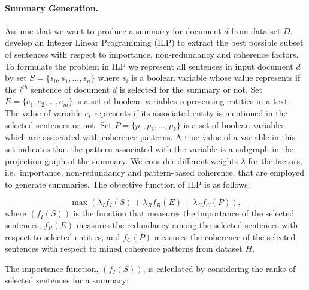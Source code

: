 \paragraph{Summary Generation.}
Assume that we want to produce a summary for document $d$ from data set $D$. 
 develop an Integer Linear Programming (ILP) to extract the best possible subset of sentences with respect to importance, non-redundancy and coherence factors. 
To formulate the problem in ILP we represent all sentences in input document $d$ by set $S = \lbrace s_0,s_1,...,s_n \rbrace$ where $s_i$ is a boolean variable whose value represents if the $i^{th}$ sentence of document $d$ is selected for the summary or not.  
Set $E=\lbrace e_1, e_2,...,e_m \rbrace$ is a set of boolean variables representing entities in a text. 
The value of variable $e_i$ represents if its associated entity is mentioned in the selected sentences or not. 
Set $P= \lbrace p_1,p_2,..., p_k \rbrace$ is a set of boolean variables which are associated with coherence patterns. 
A true value of a variable in this set indicates that the pattern associated with the variable is a subgraph in the projection graph of the summary. 
We consider different weights $\lambda$ for the factors, i.e.\ importance, non-redundancy and pattern-based coherence, that are employed to generate summaries. 
The objective function of ILP is as follows:

\begin{equation}
\max(\lambda_I f_I(S) + \lambda_R f_R(E) + \lambda_C f_C(P )),
\end{equation}
where $(f_I(S))$ is the function that measures the importance of the selected sentences, $f_R(E)$ measures the redundancy among the selected sentences with respect to selected entities, and $f_C(P)$ measures the coherence of the selected sentences with respect to mined coherence patterns from dataset $H$. 

The importance function, $(f_I(S))$, is calculated by considering the ranks of selected sentences for a summary:

